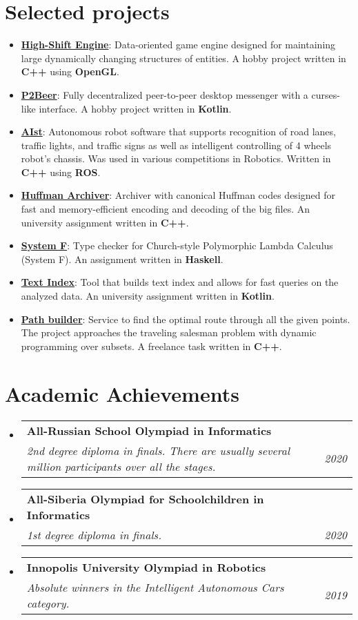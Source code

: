 \documentclass[letterpaper,11pt]{article}
\makeatletter
\newcommand{\resumeItem}[2]{
  \item\small{
    \textbf{#1}{: #2 \vspace{-2pt}}
  }
}
\newcommand{\resumeSubheading}[4]{
  \vspace{-1pt}\item
    \begin{tabular*}{0.97\textwidth}{l@{\extracolsep{\fill}}r}
      \textbf{#1} & #2 \\
      \textit{\small#3} & \textit{\small #4} \\
    \end{tabular*}\vspace{-5pt}
}
\newcommand{\resumeSubItem}[2]{\resumeItem{#1}{#2}\vspace{-4pt}}
\newcommand{\resumeSubHeadingListStart}{\begin{itemize}[leftmargin=*]}
\newcommand{\resumeSubHeadingListEnd}{\end{itemize}}
\makeatother
\begin{document}
\section{Selected projects}
  \resumeSubHeadingListStart
    \resumeSubItem{\href{https://github.com/bot-mne-v-rot/high-shift-engine}{High-Shift Engine}}
      {Data-oriented game engine designed for maintaining large dynamically changing structures of entities. A hobby project written in \textbf{C++} using \textbf{OpenGL}.}
    \resumeSubItem{\href{https://github.com/bot-mne-v-rot/p2beer}{P2Beer}}
      {Fully decentralized peer-to-peer desktop messenger with a curses-like interface. A hobby project written in \textbf{Kotlin}.}
    \resumeSubItem{\href{https://github.com/SmnTin/AIst}{AIst}}
      {Autonomous robot software that supports recognition of road lanes, traffic lights, and traffic signs as well as intelligent controlling of 4 wheels robot's chassis. Was used in various competitions in Robotics. Written in \textbf{C++} using \textbf{ROS}.}
    \resumeSubItem{\href{https://github.com/SmnTin/huffman-archiver}{Huffman Archiver}}
      {Archiver with canonical Huffman codes designed for fast and memory-efficient encoding and decoding of the big files. An university assignment written in \textbf{C++}.}
    \resumeSubItem{\href{https://github.com/SmnTin/simple-type-checker/tree/system-f}{System F}}
      {Type checker for Church-style Polymorphic Lambda Calculus (System F). An assignment written in \textbf{Haskell}.}
    \resumeSubItem{\href{https://github.com/SmnTin/prog-2020-text-index-SmnTin}{Text Index}}
      {Tool that builds text index and allows for fast queries on the analyzed data.  An university assignment written in \textbf{Kotlin}.}
    \resumeSubItem{\href{https://github.com/SmnTin/PathBuilder}{Path builder}}{Service to find the optimal route through all the given points. The project approaches the traveling salesman problem with dynamic programming over subsets. A freelance task written in \textbf{C++}.}
  \resumeSubHeadingListEnd

\section{Academic Achievements}
  \resumeSubHeadingListStart
    \resumeSubheading{All-Russian School Olympiad in Informatics}{}
    {2nd degree diploma in finals. There are usually several million participants over all the stages.}{2020}
    \resumeSubheading{All-Siberia Olympiad for Schoolchildren in Informatics}{}
    {1st degree diploma in finals.}{2020}
    \resumeSubheading{Innopolis University Olympiad in Robotics}{}
    {Absolute winners in the Intelligent Autonomous Cars category.}{2019}
  \resumeSubHeadingListEnd
\end{document}
